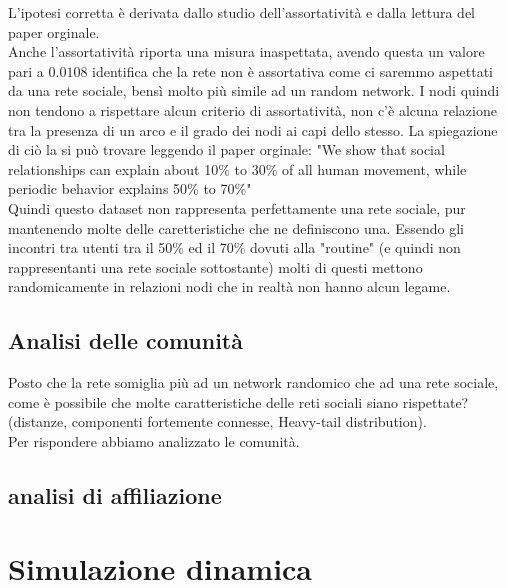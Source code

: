 \documentclass[a4paper]{article}
\begin{document}
L'ipotesi corretta è derivata dallo studio dell'assortatività e dalla lettura del paper orginale.\\
Anche l'assortatività riporta una misura inaspettata, avendo questa un valore pari a $0.0108$ identifica che la rete non è assortativa come ci saremmo aspettati da una rete sociale, bensì molto più simile ad un random network.
I nodi quindi non tendono a rispettare alcun criterio di assortatività, non c'è alcuna relazione tra la presenza di un arco e il grado dei nodi ai capi dello stesso.
La spiegazione di ciò la si può trovare leggendo il paper orginale: 
"We show that social relationships can explain about 10\% to 30\% of all human movement, while periodic behavior explains 50\% to 70\%"\\ %
Quindi questo dataset non rappresenta perfettamente una rete sociale, pur mantenendo molte delle caretteristiche che ne definiscono una.
Essendo gli incontri tra utenti tra il 50\% ed il 70\% dovuti alla "routine" (e quindi non rappresentanti una rete sociale sottostante) molti di questi mettono randomicamente in relazioni nodi che in realtà non hanno alcun legame.

\subsection{Analisi delle comunità}
Posto che la rete somiglia più ad un network randomico che ad una rete sociale, come è possibile che molte caratteristiche delle reti sociali siano rispettate? (distanze, componenti fortemente connesse, Heavy-tail distribution).\\
Per rispondere abbiamo analizzato le comunità.

\subsection{analisi di affiliazione}
\section{Simulazione dinamica}
\end{document}
